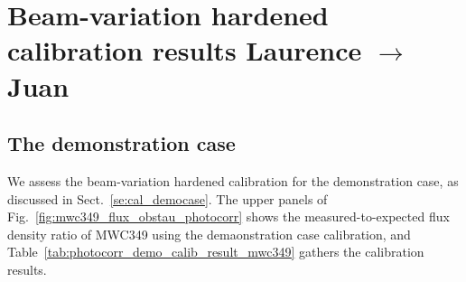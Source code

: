 %
%
%
\section{Beam-variation hardened calibration results {\color{blue} Laurence $\rightarrow$ Juan}}

\subsection{The demonstration case}

We assess the beam-variation hardened calibration for the
demonstration case, as discussed in Sect.~\ref{se:cal_democase}.
The upper panels of Fig.~\ref{fig:mwc349_flux_obstau_photocorr} shows
the measured-to-expected flux density
ratio of MWC349 using the demaonstration case calibration, and
Table~\ref{tab:photocorr_demo_calib_result_mwc349} gathers the
calibration results. 

